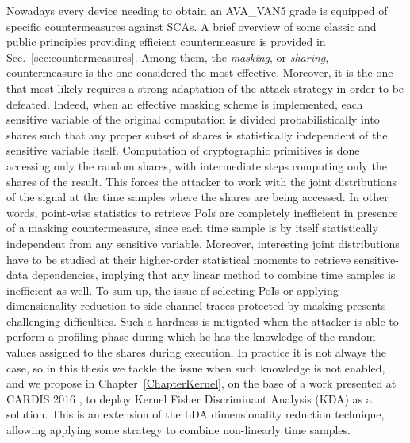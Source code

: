Nowadays every device needing to obtain an AVA\_VAN5 grade is equipped of specific countermeasures against SCAs. A brief overview of some classic and public principles providing efficient countermeasure is provided in Sec.~\ref{sec:countermeasures}. Among them, the \emph{masking}, or \emph{sharing}, countermeasure is the one considered the most effective. Moreover, it is the one that most likely requires a strong adaptation of the attack strategy in order to be defeated. Indeed, when an effective masking scheme is implemented, each sensitive variable of the original computation is divided probabilistically into shares such that any proper subset
of shares is statistically independent of the sensitive variable itself. Computation of cryptographic primitives is done
accessing only the random shares, with intermediate steps computing only the shares of the result. This forces the attacker to work with the joint distributions of the signal at the time samples where the shares are being accessed. In other words, point-wise statistics to retrieve PoIs are completely inefficient in presence of a masking countermeasure, since each time sample is by itself statistically independent from any sensitive variable. Moreover, interesting joint distributions have to be studied at their higher-order statistical moments to retrieve sensitive-data dependencies, implying that any linear method to combine time samples is inefficient as well. To sum up, the issue of selecting PoIs or applying dimensionality reduction to side-channel traces protected by masking presents challenging difficulties. Such a hardness is mitigated when the attacker is able to perform a profiling phase during which he has the knowledge of the random values assigned to the shares during execution. In practice it is not always the case, so in this thesis we tackle the issue when such knowledge is not enabled, and we propose in Chapter~\ref{ChapterKernel}, on the base of a work presented at CARDIS 2016 \cite{cagli2016kernel}, to deploy Kernel Fisher Discriminant Analysis (KDA) as a solution. This is an extension of the LDA dimensionality reduction technique, allowing applying some strategy to combine non-linearly time samples. 

